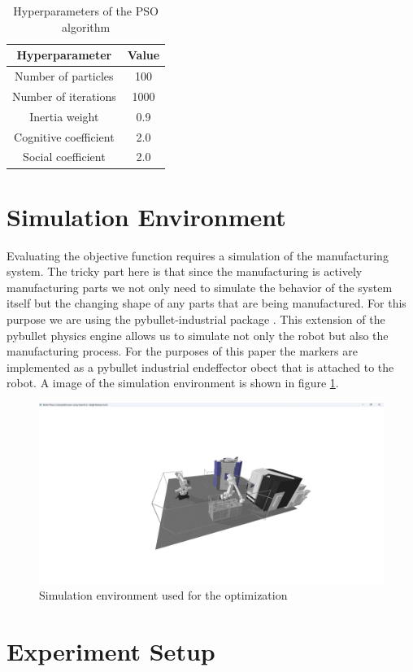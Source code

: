 \documentclass{svproc}
\begin{document}
\begin{table}  %
        \centering
        \begin{tabular}{c|c}
                Hyperparameter & Value \\
                \hline
                Number of particles & 100 \\
                Number of iterations & 1000 \\
                Inertia weight & 0.9 \\
                Cognitive coefficient & 2.0 \\
                Social coefficient & 2.0 \\
        \end{tabular}
        \caption{Hyperparameters of the PSO algorithm}
        \label{tab:hyperparameters}
\end{table}

\section{Simulation Environment}
Evaluating the objective function requires a simulation of the manufacturing system.
The tricky part here is that since the manufacturing is actively manufacturing parts we not only need to simulate the behavior of the system itself but the changing shape of any parts that are being manufactured.
For this purpose we are using the pybullet-industrial package \cite{pybullet_industrial}.
This extension of the pybullet physics engine allows us to simulate not only the robot but also the manufacturing process.
For the purposes of this paper the markers are implemented as a pybullet industrial endeffector obect that is attached to the robot.
A image of the simulation environment is shown in figure \ref{fig:simulation}.
\begin{figure}
        \centering
        \includegraphics[width=\textwidth]{figures/simulation.png}
        \caption{Simulation environment used for the optimization}
        \label{fig:simulation}
\end{figure}

\section{Experiment Setup}
\end{document}
